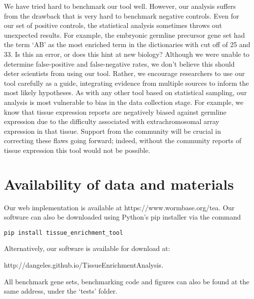\documentclass[linenumbers, doublespacing]{bmcart}
\begin{document}
We have tried hard to benchmark our tool well. However, our analysis suffers from the drawback that is very hard to benchmark negative controls. Even for our set of positive controls, the statistical analysis sometimes throws out unexpected results. For example, the embryonic germline precursor gene set had the term `AB' as the most enriched term in the dictionaries with cut off of 25 and 33. Is this an error, or does this hint at new biology? Although we were unable to determine false-positive and false-negative rates, we don't believe this should deter scientists from using our tool. Rather, we encourage researchers to use our tool carefully as a guide, integrating evidence from multiple sources to inform the most likely hypotheses. As with any other tool based on statistical sampling, our analysis is most vulnerable to bias in the data collection stage. For example, we know that tissue expression reports are negatively biased against germline expression due to the difficulty associated with extrachromosomal array expression in that tissue. Support from the community will be crucial in correcting these flaws going forward; indeed, without the community reports of tissue expression this tool would not be possible. 

\section*{Availability of data and materials}
Our web implementation is available at https://www.wormbase.org/tea. Our software can also be downloaded using Python's pip installer via the command 

\texttt{pip install tissue\_enrichment\_tool}

Alternatively, our software is available for download at:

http://dangeles.github.io/TissueEnrichmentAnalysis. 

All benchmark gene sets, benchmarking code and figures can also be found at the same address, under the `tests' folder. 

\end{document}
